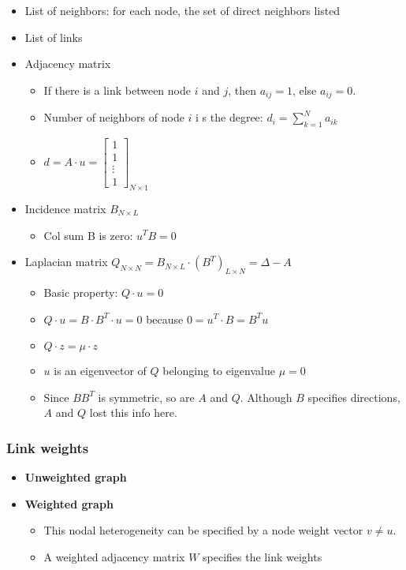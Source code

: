 \begin{itemize}
  \item List of neighbors: for each node, the set of direct neighbors listed
  \item List of links
  \item Adjacency matrix
  \begin{itemize}
    \item If there is a link between node $i$ and $j$, then $a_{ij} = 1$, else $a_{ij} = 0$.
    \item Number of neighbors of node $i$ i s the degree: $d_i = \sum_{k = 1}^{N} a_{ik}$
    \item
    $
    d = A \cdot u =
    \begin{bmatrix}
      1 \\ 1 \\ \vdots \\ 1
    \end{bmatrix}_{N \times 1}
    $
  \end{itemize}
  \item Incidence matrix $B_{N \times L}$
  \begin{itemize}
    \item Col sum B is zero: $u^T B = 0$
  \end{itemize}
  \item Laplacian matrix $Q_{N \times N} = B_{N \times L} \cdot (B^T)_{L \times N} = \Delta - A$
  \begin{itemize}
    \item Basic property: $Q \cdot u = 0$
    \item $Q \cdot u = B \cdot B^T \cdot u = 0$ because $0 = u^T \cdot B = B^T u$
    \item $Q \cdot z = \mu \cdot z$
    \item $u$ is an eigenvector of $Q$ belonging to eigenvalue $\mu = 0$
    \item Since $BB^T$ is symmetric, so are $A$ and $Q$. Although $B$ specifies directions,
    $A$ and $Q$ lost this info here.
  \end{itemize}
\end{itemize}

\subsubsection{Link weights}
\begin{itemize}
  \item \textbf{Unweighted graph}
  \item \textbf{Weighted graph}
  \begin{itemize}
    \item This nodal heterogeneity can be specified by a node weight vector $v \ne u$.
    \item A weighted adjacency matrix $W$ specifies the link weights
  \end{itemize}
\end{itemize}

